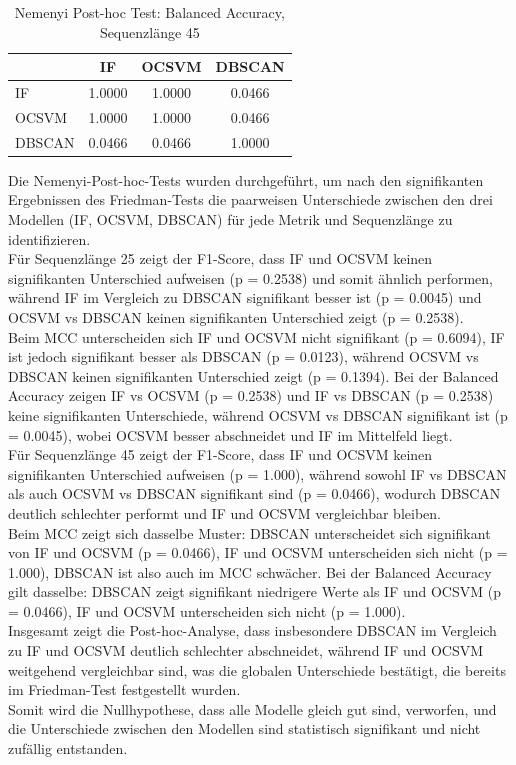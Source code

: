 \documentclass[a4paper,12pt]{article}
\begin{document}
	\begin{table}[H]
		\centering
		\caption{Nemenyi Post-hoc Test: Balanced Accuracy, Sequenzlänge 45}
		\begin{tabular}{lccc}
			\hline
			& IF & OCSVM & DBSCAN \\
			\hline
			IF      & 1.0000 & 1.0000 & 0.0466 \\
			OCSVM   & 1.0000 & 1.0000 & 0.0466 \\
			DBSCAN  & 0.0466 & 0.0466 & 1.0000 \\
			\hline
		\end{tabular}
	\end{table}
	Die Nemenyi-Post-hoc-Tests wurden durchgeführt, um nach den signifikanten Ergebnissen des Friedman-Tests die paarweisen Unterschiede zwischen den drei Modellen (IF, OCSVM, DBSCAN) für jede Metrik und Sequenzlänge zu identifizieren.
	\\[0.5em]
	Für Sequenzlänge 25 zeigt der F1-Score, dass IF und OCSVM keinen signifikanten Unterschied aufweisen (p = 0.2538) und somit ähnlich performen, während IF im Vergleich zu DBSCAN signifikant besser ist (p = 0.0045) und OCSVM vs DBSCAN keinen signifikanten Unterschied zeigt (p = 0.2538). 
	\\[0.5em]
	Beim MCC unterscheiden sich IF und OCSVM nicht signifikant (p = 0.6094), IF ist jedoch signifikant besser als DBSCAN (p = 0.0123), während OCSVM vs DBSCAN keinen signifikanten Unterschied zeigt (p = 0.1394). Bei der Balanced Accuracy zeigen IF vs OCSVM (p = 0.2538) und IF vs DBSCAN (p = 0.2538) keine signifikanten Unterschiede, während OCSVM vs DBSCAN signifikant ist (p = 0.0045), wobei OCSVM besser abschneidet und IF im Mittelfeld liegt.
	\\[0.5em]
	Für Sequenzlänge 45 zeigt der F1-Score, dass IF und OCSVM keinen signifikanten Unterschied aufweisen (p = 1.000), während sowohl IF vs DBSCAN als auch OCSVM vs DBSCAN signifikant sind (p = 0.0466), wodurch DBSCAN deutlich schlechter performt und IF und OCSVM vergleichbar bleiben. 
	\\[0.5em]
	Beim MCC zeigt sich dasselbe Muster: DBSCAN unterscheidet sich signifikant von IF und OCSVM (p = 0.0466), IF und OCSVM unterscheiden sich nicht (p = 1.000), DBSCAN ist also auch im MCC schwächer. Bei der Balanced Accuracy gilt dasselbe: DBSCAN zeigt signifikant niedrigere Werte als IF und OCSVM (p = 0.0466), IF und OCSVM unterscheiden sich nicht (p = 1.000). 
	\\[0.5em]
	Insgesamt zeigt die Post-hoc-Analyse, dass insbesondere DBSCAN im Vergleich zu IF und OCSVM deutlich schlechter abschneidet, während IF und OCSVM weitgehend vergleichbar sind, was die globalen Unterschiede bestätigt, die bereits im Friedman-Test festgestellt wurden.
	\\[0.5em]
	Somit wird die Nullhypothese, dass alle Modelle gleich gut sind, verworfen, und die Unterschiede zwischen den Modellen sind statistisch signifikant und nicht zufällig entstanden.
	
\end{document}
